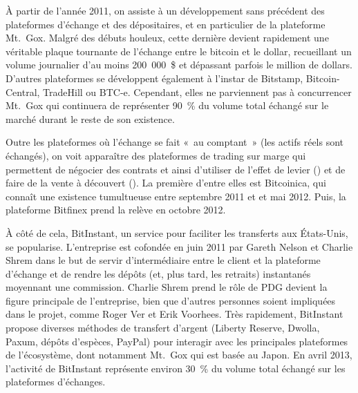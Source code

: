 À partir de l'année 2011, on assiste à un développement sans précédent des plateformes d'échange et des dépositaires, et en particulier de la plateforme Mt.~Gox. Malgré des débuts houleux, cette dernière devient rapidement une véritable plaque tournante de l'échange entre le bitcoin et le dollar, recueillant un volume journalier d'au moins 200~000~\$ et dépassant parfois le million de dollars. D'autres plateformes se développent également à l'instar de Bitstamp, Bitcoin-Central, TradeHill ou BTC-e. Cependant, elles ne parviennent pas à concurrencer Mt.~Gox qui continuera de représenter 90~\% du volume total échangé sur le marché durant le reste de son existence.

Outre les plateformes où l'échange se fait «~au comptant~» (les actifs réels sont échangés), on voit apparaître des plateformes de trading sur marge qui permettent de négocier des contrats et ainsi d'utiliser de l'effet de levier () et de faire de la vente à découvert (). La première d'entre elles est Bitcoinica, qui connaît une existence tumultueuse entre septembre 2011 et et mai 2012. Puis, la plateforme Bitfinex prend la relève en octobre 2012.

À côté de cela, BitInstant, un service pour faciliter les transferts aux États-Unis, se popularise. L'entreprise est cofondée en juin 2011 par Gareth Nelson et Charlie Shrem dans le but de servir d'intermédiaire entre le client et la plateforme d'échange et de rendre les dépôts (et, plus tard, les retraits) instantanés moyennant une commission. Charlie Shrem prend le rôle de PDG devient la figure principale de l'entreprise, bien que d'autres personnes soient impliquées dans le projet, comme Roger Ver et Erik Voorhees. Très rapidement, BitInstant propose diverses méthodes de transfert d'argent (Liberty Reserve, Dwolla, Paxum, dépôts d'espèces, PayPal) pour interagir avec les principales plateformes de l'écosystème, dont notamment Mt.~Gox qui est basée au Japon. En avril 2013, l'activité de BitInstant représente environ 30~\% du volume total échangé sur les plateformes d'échanges.

